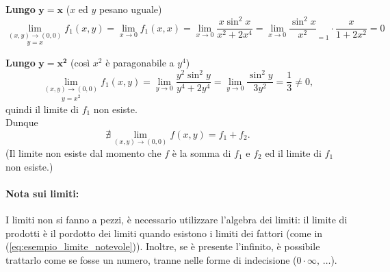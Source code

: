 \begin{example}
	\noindent \textbf{Lungo} $\boldsymbol{y=x}$ ($x$ ed $y$ pesano uguale)
	\begin{equation}\label{eq:esempio_limite_notevole}
			\underset{y=x}{\lim_{(x,y)\rightarrow(0,0)}} f_1(x,y) = \lim_{x\rightarrow 0} f_1(x,x) = \lim_{x\rightarrow 0}\frac{x\sin^2x}{x^2+2x^4} = \lim_{x\rightarrow 0}\boxed{\frac{\sin^2x}{x^2}}_{=1}\cdot\frac{x}{1+2x^2}=0
	\end{equation}
	
	\noindent \textbf{Lungo} $\boldsymbol{y=x^2}$ (così $x^2$ è paragonabile a $y^4$)
	\begin{equation*}
		\underset{y=x^2}{\lim_{(x,y)\rightarrow(0,0)}} f_1(x,y) = \lim_{y\rightarrow 0}\frac{y^2\sin^2y}{y^4+2y^4} = \lim_{y\rightarrow 0} \frac{\sin^2y}{3y^2} =\frac{1}{3} \neq 0,
	\end{equation*}
	quindi il limite di $f_1$ non esiste.\\
	Dunque
	\begin{equation*}
		\nexists \lim_{(x,y)\rightarrow(0,0)} f(x,y) = f_1 + f_2.
	\end{equation*}
	(Il limite non esiste dal momento che $f$ è la somma di $f_1$ e $f_2$ ed il limite di $f_1$ non esiste.)
\end{example}

\paragraph{Nota sui limiti:} I limiti non si fanno a pezzi, è necessario utilizzare l'algebra dei limiti: il limite di prodotti è il pordotto dei limiti quando esistono i limiti dei fattori (come in (\ref{eq:esempio_limite_notevole})). Inoltre, se è presente l'infinito, è possibile trattarlo come se fosse un numero, tranne nelle forme di indecisione ($0\cdot\infty,\, \hdots$).

